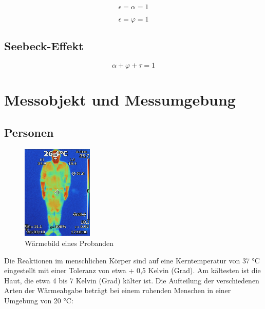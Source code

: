 \begin{equation}
\label{eq4}
\epsilon = \alpha  = 1
\end{equation}

\begin{equation}
\label{eq4}
\epsilon = \varphi  = 1
\end{equation}



\subsection{Seebeck-Effekt}

\begin{equation}
\label{eq4}
\alpha + \varphi + \tau  = 1
\end{equation}



\section{Messobjekt und Messumgebung}


\subsection{Personen}


\begin{figure}[H]
	\centering
	\includegraphics[width=0.3\textwidth]
	{fig/person_waerme.JPG}
	\caption[Wäermebild eines Probanden]{Wärmebild eines Probanden}
	\label{fig:Waermebild}
\end{figure}

Die Reaktionen im menschlichen Körper sind auf eine Kerntemperatur von 37 °C eingestellt mit einer Toleranz von etwa + 0,5 Kelvin (Grad). Am kältesten ist die Haut, die etwa 4 bis 7 Kelvin (Grad) kälter ist. Die Aufteilung der verschiedenen Arten der Wärmeabgabe beträgt bei einem ruhenden Menschen in einer Umgebung von 20 °C:

